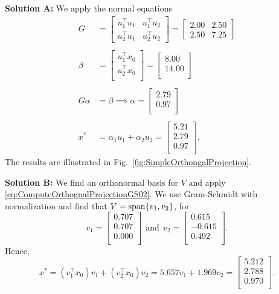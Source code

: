 \textbf{Solution A:} We apply the normal equations
\begin{align*}
G &= \left[ \begin{array}{rr} u_1^\top u_1 & u_1^\top u_2 \\ u_2^\top u_1 & u_2^\top u_2 \end{array} \right] = \left[ \begin{array}{rr} 2.00 & 2.50 \\
2.50 & 7.25  \end{array} \right] \\
\\
\beta&=  \left[ \begin{array}{r} u_1^\top x_0 \\
u_2^\top x_0 \\\end{array} \right]= \left[ \begin{array}{r} 8.00 \\
14.00 \\\end{array} \right] \\
\\
G \alpha & =  \beta \implies \alpha= \left[
\begin{array}{c}
2.79 \\
0.97 \\
\end{array}
\right]\\
\\
x^\ast & = \alpha_1 u_1 + \alpha_2 u_2 = \left[
\begin{array}{c}
5.21 \\
2.79 \\
0.97 \\
\end{array}
\right].
\end{align*}
The results are illustrated in Fig.~\ref{fig:SimpleOrthongalProjection}.

\vspace*{0.2cm}
\textbf{Solution B:} We find an orthonormal basis for $V$ and apply \eqref{eq:ComputeOrthognalProjectionGS02}. We use Gram-Schmidt with normalization and find that
$V=\mathrm{span} \{ v_1, v_2 \}$, for 
$$v_1=
\left[
\begin{array}{r}
0.707 \\
0.707 \\
0.000 \\
\end{array}
\right]
~~\text{and}~~v_2=
\left[
\begin{array}{r}
0.615 \\
-0.615 \\
0.492 \\
\end{array}
\right].
 $$
 Hence, 
 $$x^\ast = \left(v_1^\top x_0 \right) v_1 + \left( v_2^\top x_0 \right) v_2  = 5.657 v_1 + 1.969 v_2 = \left[
\begin{array}{c}
5.212 \\
2.788 \\
0.970 \\
\end{array}
\right].  $$

